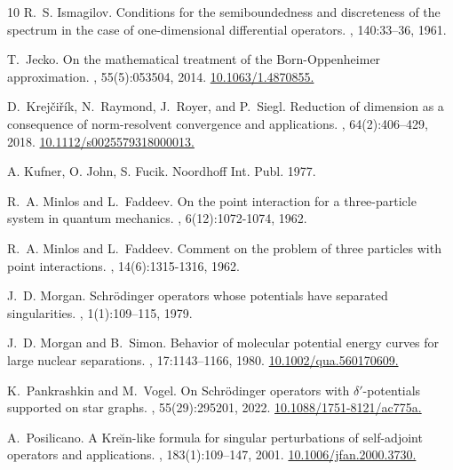 \documentclass[a4paper,11pt,reqno]{amsart}
\theoremstyle{definition}
\numberwithin{equation}{section}
\begin{document}
\begin{thebibliography}{10}
R.~S. Ismagilov.
\newblock Conditions for the semiboundedness and discreteness of the spectrum
  in the case of one-dimensional differential operators.
, 140:33--36, 1961.

T.~Jecko.
\newblock On the mathematical treatment of the Born-Oppenheimer approximation.
, 55(5):053504, 2014. \href{https://doi.org/10.1063/1.4870855}{10.1063/1.4870855.}

D.~Krej\v{c}i\v{r}\'ik, N.~Raymond, J.~Royer, and P.~Siegl.
\newblock Reduction of dimension as a consequence of norm-resolvent convergence
  and applications.
, 64(2):406--429, 2018. \href{https://doi.org/10.1112/s0025579318000013}{10.1112/s0025579318000013.}

 A. Kufner, O. John, S. Fucik.  
\newblock Noordhoff Int. Publ. 1977.

R.~A. Minlos and L.~Faddeev.
\newblock On the point interaction for a three-particle system in quantum mechanics.
, 6(12):1072-1074, 1962.

R.~A. Minlos and L.~Faddeev.
\newblock Comment on the problem of three particles with point interactions.
, 14(6):1315-1316, 1962.

J.~D. Morgan.
\newblock Schr\"odinger operators whose potentials have separated
  singularities.
, 1(1):109--115, 1979. 

J.~D. Morgan and B.~Simon.
\newblock Behavior of molecular potential energy curves for large nuclear separations.
, 17:1143--1166, 1980. \href{https://doi.org/10.1002/qua.560170609}{10.1002/qua.560170609.}

K.~Pankrashkin and M.~Vogel.
\newblock On Schr\"odinger operators with $\delta'$-potentials supported on star graphs.
, 55(29):295201, 2022. \href{https://doi.org/10.1088/1751-8121/ac775a}{10.1088/1751-8121/ac775a.}

A.~Posilicano.
\newblock A {K}re\u{\i}n-like formula for singular perturbations of
  self-adjoint operators and applications.
, 183(1):109--147, 2001. \href{https://doi.org/10.1006/jfan.2000.3730}{10.1006/jfan.2000.3730.}


\end{thebibliography}
\end{document}
